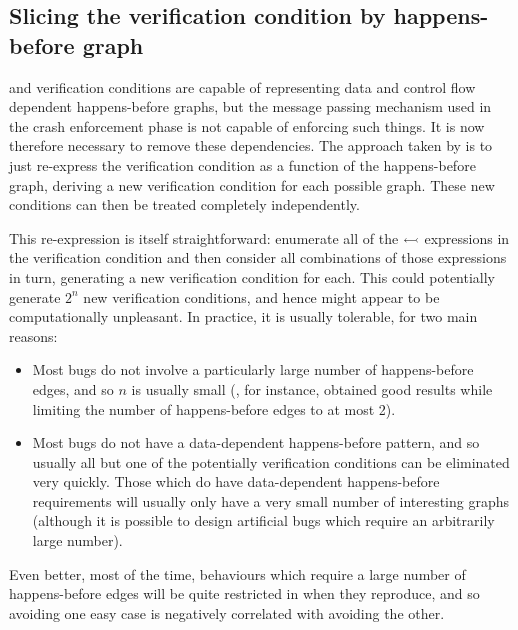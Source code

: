 \subsection{Slicing the verification condition by happens-before graph}
\label{sect:enforce:slice_hb_graph}

{\STateMachines} and verification conditions are capable of
representing data and control flow dependent happens-before graphs,
but the message passing mechanism used in the crash enforcement phase
is not capable of enforcing such things.  It is now therefore
necessary to remove these dependencies.  The approach taken by
{\implementation} is to just re-express the verification condition as
a function of the happens-before graph, deriving a new verification
condition for each possible graph.  These new conditions can then be
treated completely independently.

This re-expression is itself straightforward: enumerate all of the
$\leftarrowtail$ expressions in the verification condition and
then consider all combinations of those expressions in turn,
generating a new verification condition for each.  This could
potentially generate $2^n$ new verification conditions, and hence
might appear to be computationally unpleasant.  In practice, it is
usually tolerable, for two main reasons:

\begin{itemize}
\item
  Most bugs do not involve a particularly large number of
  happens-before edges, and so $n$ is usually small (, for instance, obtained good
  results while limiting the number of happens-before edges to at most
  2).
\item
  Most bugs do not have a data-dependent happens-before pattern, and
  so usually all but one of the potentially verification conditions
  can be eliminated very quickly.  Those which do have data-dependent
  happens-before requirements will usually only have a very small
  number of interesting graphs (although it is possible to design
  artificial bugs which require an arbitrarily large number).
\end{itemize}

Even better, most of the time, behaviours which require a large number
of happens-before edges will be quite restricted in when they
reproduce, and so avoiding one easy case is negatively correlated with
avoiding the other.


